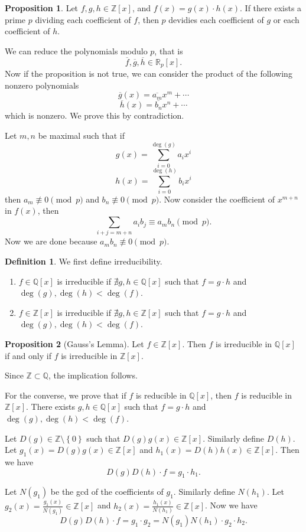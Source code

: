 \documentclass[11pt]{article}
\theoremstyle{definition}
\newtheorem{defn}{Definition}[section]
\newtheorem{prop}{Proposition}[section]
\newcommand{\sm}[0]{\setminus}
\newcommand{\set}[1]{\left\{ #1 \right\}}
\newcommand{\FF}{\mathbb{R}}
\newcommand{\QQ}{\mathbb{Q}}
\newcommand{\ZZ}{\mathbb{Z}}
\begin{document}
\begin{prop}
	Let $f,g,h\in\ZZ[x]$, and $f(x) = g(x)\cdot h(x)$. 
	If there exists a prime $p$ dividing each coefficient of $f$, then $p$ devidies each coefficient of $g$ or each coefficient of $h$. 
\end{prop}
	We can reduce the polynomials modulo $p$, that is 
	$$ \overline{f}, \overline{g}, \overline{h} \in \FF_p[x]. $$
	Now if the proposition is not true, we can consider the product of the following nonzero polynomials
	$$ \overline{g}(x) = \overline{a_m}x^m + \cdots $$
	$$ \overline{h}(x) = \overline{b_n}x^n + \cdots $$
	which is nonzero.
\qedhere
\proof
	We prove this by contradiction.

	Let $m,n$ be maximal such that if 
	$$ g(x) = \sum_{i=0}^{\deg(g)} a_i x^i $$
	$$ h(x) = \sum_{i=0}^{\deg(h)} b_i x^i $$
	then $a_m \not\equiv 0 \pmod{p}$ and $b_n \not\equiv 0 \pmod{p}$. 
	Now consider the coefficient of $x^{m+n}$ in $f(x)$, then
	$$ \sum_{i+j=m+n} a_i b_j \equiv a_m b_n \pmod{p} . $$
	Now we are done because $a_m b_n \not\equiv 0 \pmod{p}$. 
\qedhere

\begin{defn}
	We first define irreducibility. 
	\begin{enumerate}
		\item $f\in\QQ[x]$ is irreducible if $\nexists g,h\in\QQ[x]$ such that $f = g\cdot h$ and $\deg(g), \deg(h) < \deg(f)$. 
		\item $f\in\ZZ[x]$ is irreducible if $\nexists g,h\in\ZZ[x]$ such that $f = g\cdot h$ and $\deg(g), \deg(h) < \deg(f)$. 
	\end{enumerate}
\end{defn}

\begin{prop}[Gauss's Lemma]
	Let $f\in\ZZ[x]$. Then $f$ is irreducible in $\QQ[x]$ if and only if $f$ is irreducible in $\ZZ[x]$. 
\end{prop}
\proof
	Since $\ZZ\subset\QQ$, the implication follows.

	For the converse, we prove that if $f$ is reducible in $\QQ[x]$, then $f$ is reducible in $\ZZ[x]$. 
	There exists $g,h\in\QQ[x]$ such that $f = g\cdot h$ and $\deg(g), \deg(h) < \deg(f)$.

	Let $D(g) \in \ZZ\sm\set{0}$ such that $D(g) g(x) \in \ZZ[x]$. Similarly define $D(h)$. 
	Let $g_1(x) = D(g) g(x) \in \ZZ[x]$ and $h_1(x) = D(h) h(x) \in \ZZ[x]$. 
	Then we have 
	$$ D(g) D(h) \cdot f = g_1 \cdot h_1. $$
	
	Let $N(g_1)$ be the gcd of the coefficients of $g_1$. Similarly define $N(h_1)$. 
	Let $g_2(x) = \frac{g_1(x)}{N(g_1)} \in \ZZ[x]$ and $h_2(x) = \frac{h_1(x)}{N(h_1)} \in \ZZ[x]$. 
	Now we have 
	$$ D(g) D(h) \cdot f = g_1 \cdot g_2 = N(g_1) N(h_1) \cdot g_2 \cdot h_2 . $$
\end{document}
